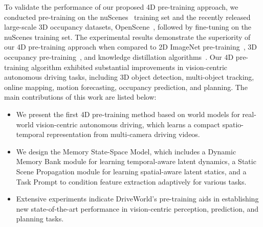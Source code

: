 To validate the performance of our proposed 4D pre-training approach, we conducted pre-training on the nuScenes~\cite{nuscenes} training set and the recently released large-scale 3D occupancy datasets, OpenScene~\cite{openscene}, followed by fine-tuning on the nuScenes training set. The experimental results demonstrate the superiority of our 4D pre-training approach when compared to 2D ImageNet pre-training~\cite{resnet}, 3D occupancy pre-training~\cite{occnet,uniscene}, and knowledge distillation algorithms~\cite{bevdistill}. Our 4D pre-training algorithm exhibited substantial improvements in vision-centric autonomous driving tasks, including 3D object detection, multi-object tracking, online mapping, motion forecasting, occupancy prediction, and planning. The main contributions of this work are listed below:
\begin{itemize}
	\item We present the first 4D pre-training method based on world models for real-world vision-centric autonomous driving, which learns a compact spatio-temporal representation from multi-camera driving videos.
	\item We design the Memory State-Space Model, which includes a Dynamic Memory Bank module for learning temporal-aware latent dynamics, a Static Scene Propagation module for learning spatial-aware latent statics, and a Task Prompt to condition feature extraction adaptively for various tasks.
	\item Extensive experiments indicate DriveWorld's pre-training aids in establishing new state-of-the-art performance in vision-centric perception, prediction, and planning tasks.
\end{itemize}

